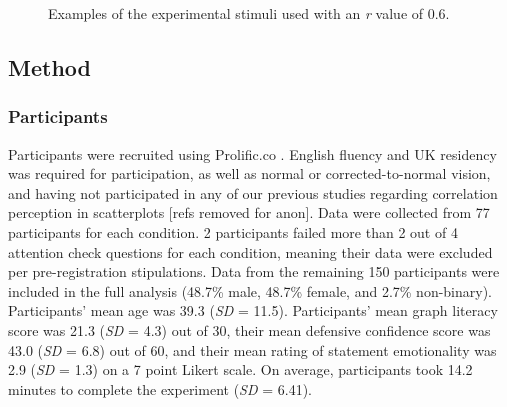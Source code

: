 \documentclass[manuscript,screen,review,anonymous]{acmart}
\begin{document}
\begin{figure}


\caption{\label{fig-main-examples}Examples of the experimental stimuli
used with an \textit{r} value of 0.6.}

\end{figure}%

\subsection{Method}\label{sec-method-main}

\subsubsection{Participants}\label{sec-participants-main}

Participants were recruited using Prolific.co \citep{prolific}. English
fluency and UK residency was required for participation, as well as
normal or corrected-to-normal vision, and having not participated in any
of our previous studies regarding correlation perception in scatterplots
{[}refs removed for anon{]}. Data were collected from 77 participants
for each condition. 2 participants failed more than 2 out of 4 attention
check questions for each condition, meaning their data were excluded per
pre-registration stipulations. Data from the remaining 150 participants
were included in the full analysis (48.7\% male, 48.7\% female, and
2.7\% non-binary). Participants' mean age was 39.3 (\emph{SD} = 11.5).
Participants' mean graph literacy score was 21.3 (\emph{SD} = 4.3) out
of 30, their mean defensive confidence score was 43.0 (\emph{SD} = 6.8)
out of 60, and their mean rating of statement emotionality was 2.9
(\emph{SD} = 1.3) on a 7 point Likert scale. On average, participants
took 14.2 minutes to complete the experiment (\emph{SD} = 6.41).
\end{document}
